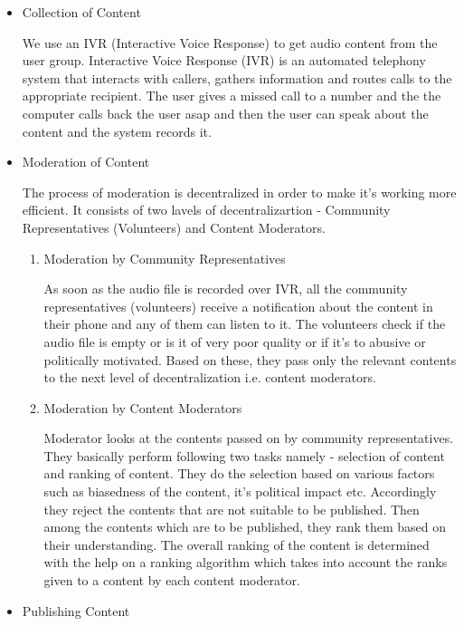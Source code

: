 \documentclass[11pt]{article}
\begin{document}
        \begin{itemize}
			\item Collection of Content


			We use an IVR (Interactive Voice Response) to get audio content from the user group. Interactive Voice Response (IVR) is an automated telephony system that interacts with callers, gathers information and routes calls to the appropriate recipient. The user gives a missed call to a number and the the computer calls back the user asap and then the user can speak about the content and the system records it.


			\item Moderation of Content


			The process of moderation is decentralized in order to make it's working more efficient. It consists of two lavels of decentralizartion - Community Representatives (Volunteers) and Content Moderators.


			\begin{enumerate}
				\item Moderation by Community Representatives


			As soon as the audio file is recorded over IVR, all the community representatives (volunteers) receive a notification about the content in their phone and any of them can listen to it. The volunteers check if the audio file is empty or is it of very poor quality or if it's to abusive or politically motivated. Based on these, they pass only the relevant contents to the next level of decentralization i.e. content moderators.


				\item Moderation by Content Moderators


			Moderator looks at the contents passed on by community representatives. They basically perform following two tasks namely - selection of content and ranking of content. They do the selection based on various factors such as biasedness of the content, it's political impact etc. Accordingly they reject the contents that are not suitable to be published. Then among the contents which are to be published, they rank them based on their understanding. The overall ranking of the content is determined with the help on a ranking algorithm which takes into account the ranks given to a content by each content moderator. 
			\end{enumerate}


			\item Publishing Content



\end{itemize}
\end{document}
